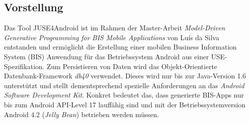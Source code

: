\documentclass[a4paper,twoside]{article}
\begin{document}


\subsection{Vorstellung}
Das Tool JUSE4Android ist im Rahmen der Master-Arbeit \textit{Model-Driven Generative Programming for BIS Mobile Applications} von Luís da Silva entstanden und ermöglicht die Erstellung einer mobilen Business Information System (BIS) Anwendung für das Betriebssystem Android aus einer USE-Spezifikation. Zum Persistieren von Daten wird das Objekt-Orientierte Datenbank-Framework \textit{db40} verwendet. Dieses wird nur bis zur Java-Version 1.6 unterstützt und stellt dementsprechend spezielle Anforderungen an das \textit{Android Software Development Kit}. Konkret bedeutet das, dass generierte BIS-Apps nur bis zum Android API-Level 17 lauffähig sind und mit der Betriebssystemversion Android 4.2 (\textit{Jelly Bean}) betrieben werden müssen. 
\end{document}
